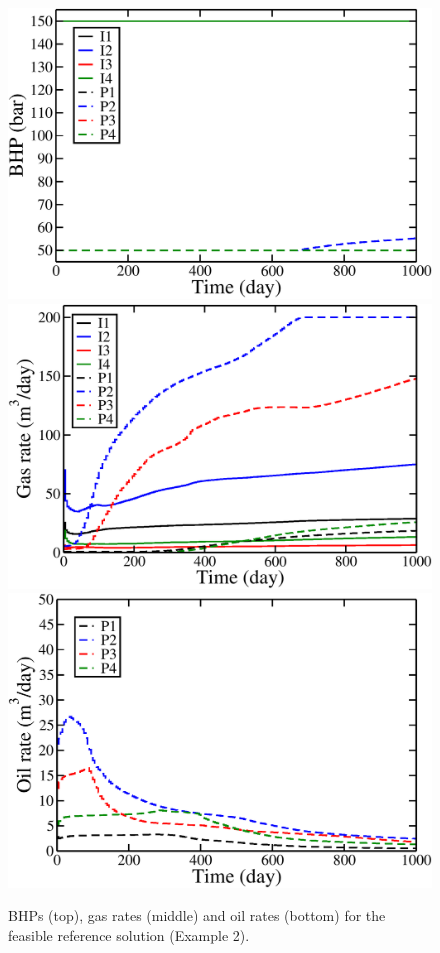 \documentclass[twocolumn,numbook]{svjour3}          %
\begin{document}
\begin{figure}
\begin{center}
\includegraphics[totalheight=2.2in,angle=0]{spe10topLayerReferenceC200_BHP.pdf}
\includegraphics[totalheight=2.17in,angle=0]{spe10topLayerReferenceC200_rate_gas.pdf}
\includegraphics[totalheight=2.2in,angle=0]{spe10topLayerReferenceC200_rate_oil.pdf}
\end{center}
\caption{BHPs (top), gas rates (middle) and oil rates
  (bottom) for the feasible reference solution (Example 2).}
\label{fig:SPE10TopLayerReferenceRates}
\end{figure}
\end{document}
